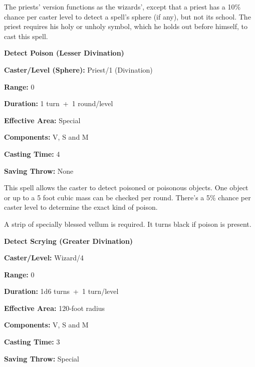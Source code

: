 \begin{multicols}{2}
\columnbreak

The priests' version functions as the wizards', except that a priest has a 10\% chance per caster level to detect a spell's sphere (if any), but not its school.  The priest requires his holy or unholy symbol, which he holds out before himself, to cast this spell.  

\vspace{1em}

\noindent
\begin{minipage}{\columnwidth}

\noindent \textbf{Detect Poison (Lesser Divination)}

\noindent \textbf{Caster/Level (Sphere):} Priest/1 (Divination)

\noindent \textbf{Range:} 0

\noindent \textbf{Duration:} 1 turn~+~1 round/level

\noindent \textbf{Effective Area:} Special

\noindent \textbf{Components:} V, S and M

\noindent \textbf{Casting Time:} 4

\noindent \textbf{Saving Throw:} None

\end{minipage}

This spell allows the caster to detect poisoned or poisonous objects.  One object or up to a 5 foot cubic mass can be checked per round.  There's a 5\% chance per caster level to determine the exact kind of poison.

A strip of specially blessed vellum is required.  It turns black if poison is present.

\vspace{1em}

\noindent
\begin{minipage}{\columnwidth}

\noindent \textbf{Detect Scrying (Greater Divination)}

\noindent \textbf{Caster/Level:} Wizard/4

\noindent \textbf{Range:} 0

\noindent \textbf{Duration:} 1d6 turns~+~1 turn/level

\noindent \textbf{Effective Area:} 120-foot radius

\noindent \textbf{Components:} V, S and M

\noindent \textbf{Casting Time:} 3

\noindent \textbf{Saving Throw:} Special


\end{minipage}
\end{multicols}
